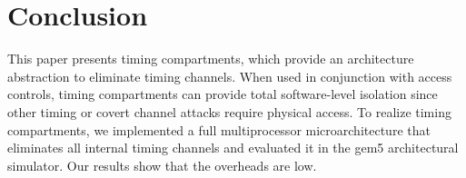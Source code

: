 \section{Conclusion}
This paper presents timing compartments, which provide an architecture 
abstraction to eliminate timing channels. When used in conjunction with access 
controls, timing compartments can provide total software-level isolation since 
other timing or covert channel attacks require physical access. To realize 
timing compartments, we implemented a full multiprocessor microarchitecture 
that eliminates all internal timing channels and evaluated it in the gem5 
architectural simulator. Our results show that the overheads are low.
